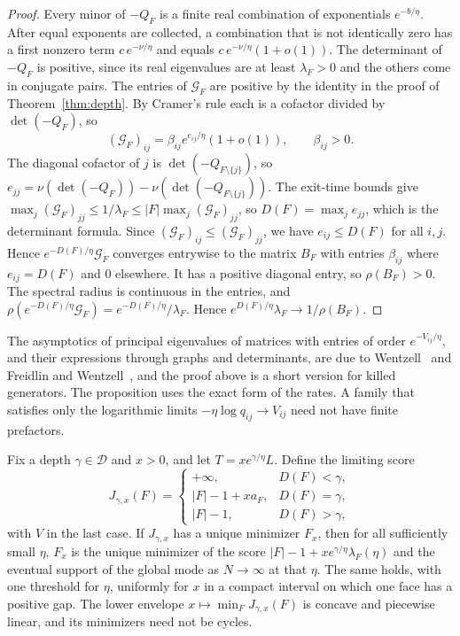 \begin{proof}
Every minor of $-Q_F$ is a finite real combination of exponentials
$e^{-b/\eta}$. After equal exponents are collected, a combination that is not
identically zero has a first nonzero term $c\,e^{-\nu/\eta}$ and equals
$c\,e^{-\nu/\eta}(1+o(1))$. The determinant of $-Q_F$ is positive, since its
real eigenvalues are at least $\lambda_F>0$ and the others come in conjugate
pairs. The entries of $\mathcal G_F$ are positive by the identity in the proof
of Theorem~\ref{thm:depth}. By Cramer's rule each is a cofactor divided by
$\det(-Q_F)$, so
\[
 (\mathcal G_F)_{ij}=\beta_{ij}e^{e_{ij}/\eta}(1+o(1)),\qquad \beta_{ij}>0 .
\]
The diagonal cofactor of $j$ is $\det(-Q_{F\setminus\{j\}})$, so
$e_{jj}=\nu(\det(-Q_F))-\nu(\det(-Q_{F\setminus\{j\}}))$. The exit-time
bounds give $\max_j(\mathcal G_F)_{jj}\le1/\lambda_F\le|F|\max_j(\mathcal G_F)_{jj}$,
so $D(F)=\max_je_{jj}$, which is the determinant formula. Since
$(\mathcal G_F)_{ij}\le(\mathcal G_F)_{jj}$, we have $e_{ij}\le D(F)$ for all
$i,j$. Hence $e^{-D(F)/\eta}\mathcal G_F$ converges entrywise to the matrix
$B_F$ with entries $\beta_{ij}$ where $e_{ij}=D(F)$ and $0$ elsewhere. It has a
positive diagonal entry, so $\rho(B_F)>0$. The spectral radius is continuous
in the entries, and $\rho(e^{-D(F)/\eta}\mathcal G_F)=e^{-D(F)/\eta}/\lambda_F$.
Hence $e^{D(F)/\eta}\lambda_F\to1/\rho(B_F)$.
\end{proof}

The asymptotics of principal eigenvalues of matrices with entries of order
$e^{-V_{ij}/\eta}$, and their expressions through graphs and determinants, are due to
Wentzell~\cite{wentzell1972} and Freidlin and
Wentzell~\cite[Chapter~6]{freidlinwentzell2012}, and the proof above is a short
version for killed generators. The proposition uses the exact form of the rates. A family
that satisfies only the logarithmic limits $-\eta\log q_{ij}\to V_{ij}$ need not have finite
prefactors.

\begin{theorem}\label{thm:critical-window}
Fix a depth $\gamma\in\mathcal D$ and $x>0$, and let $T=xe^{\gamma/\eta}L$.
Define the limiting score
\[
 J_{\gamma,x}(F)=\begin{cases}+\infty,&D(F)<\gamma,\\ |F|-1+xa_F,&D(F)=\gamma,\\ |F|-1,&D(F)>\gamma,\end{cases}
\]
with $V$ in the last case. If $J_{\gamma,x}$ has a unique minimizer $F_x$, then
for all sufficiently small $\eta$, $F_x$ is the unique minimizer of the score
$|F|-1+xe^{\gamma/\eta}\lambda_F(\eta)$ and the eventual support of the global mode
as $N\to\infty$ at that $\eta$. The same holds, with one threshold for $\eta$,
uniformly for $x$ in a compact interval on which one face has a positive gap.
The lower envelope
$x\mapsto\min_FJ_{\gamma,x}(F)$ is concave and piecewise linear, and its
minimizers need not be cycles.
\end{theorem}

